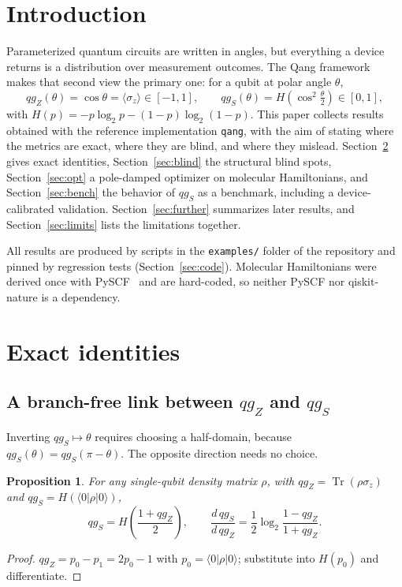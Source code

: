 \documentclass[11pt]{article}
\newtheorem{proposition}{Proposition}
\newcommand{\qgZ}{qg_Z}
\newcommand{\qgS}{qg_S}
\newcommand{\Tr}{\operatorname{Tr}}
\begin{document}
\section{Introduction}

Parameterized quantum circuits are written in angles, but everything a device returns is a
distribution over measurement outcomes. The Qang framework~\cite{monteverde2026qang} makes that
second view the primary one: for a qubit at polar angle $\theta$,
\begin{equation}
  \qgZ(\theta)=\cos\theta=\langle\sigma_z\rangle\in[-1,1],\qquad
  \qgS(\theta)=H\!\left(\cos^2\tfrac{\theta}{2}\right)\in[0,1],
\end{equation}
with $H(p)=-p\log_2p-(1-p)\log_2(1-p)$. This paper collects results obtained with the reference
implementation \texttt{qang}, with the aim of stating where the metrics are exact, where they are
blind, and where they mislead. Section~\ref{sec:identities} gives exact identities,
Section~\ref{sec:blind} the structural blind spots, Section~\ref{sec:opt} a pole-damped optimizer
on molecular Hamiltonians, and Section~\ref{sec:bench} the behavior of $\qgS$ as a benchmark,
including a device-calibrated validation. Section~\ref{sec:further} summarizes later results, and
Section~\ref{sec:limits} lists the limitations together.

All results are produced by scripts in the \texttt{examples/} folder of the repository and pinned
by regression tests (Section~\ref{sec:code}). Molecular Hamiltonians were derived once with
PySCF~\cite{sun2018pyscf} and are hard-coded, so neither PySCF nor qiskit-nature is a dependency.

\section{Exact identities}\label{sec:identities}

\subsection{A branch-free link between \texorpdfstring{$\qgZ$}{qgZ} and \texorpdfstring{$\qgS$}{qgS}}

Inverting $\qgS\mapsto\theta$ requires choosing a half-domain, because $\qgS(\theta)=\qgS(\pi-\theta)$.
The opposite direction needs no choice.

\begin{proposition}\label{prop:identity}
For any single-qubit density matrix $\rho$, with $\qgZ=\Tr(\rho\sigma_z)$ and $\qgS=H(\langle0|\rho|0\rangle)$,
\begin{equation}
  \qgS=H\!\left(\frac{1+\qgZ}{2}\right),\qquad
  \frac{d\,\qgS}{d\,\qgZ}=\frac12\log_2\frac{1-\qgZ}{1+\qgZ}.
\end{equation}
\end{proposition}
\begin{proof}
$\qgZ=p_0-p_1=2p_0-1$ with $p_0=\langle0|\rho|0\rangle$; substitute into $H(p_0)$ and differentiate.
\end{proof}
\end{document}
